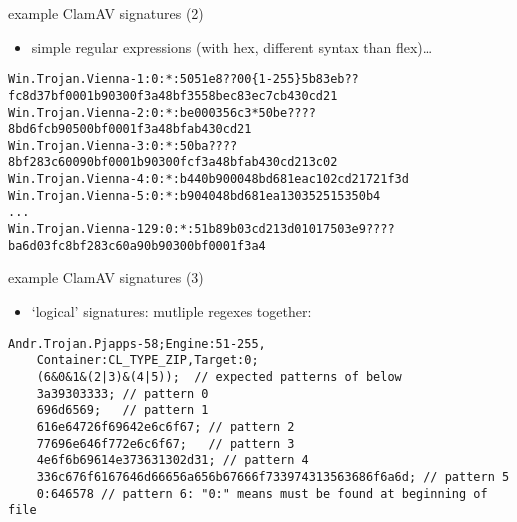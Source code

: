 \begin{frame}[fragile,label=exampleSigsRE]{example ClamAV signatures (2)}
    \begin{itemize}
    \item simple regular expressions (with hex, different syntax than flex)\ldots
    \end{itemize}
\begin{Verbatim}[fontsize=\fontsize{9}{10}]
Win.Trojan.Vienna-1:0:*:5051e8??00{1-255}5b83eb??fc8d37bf0001b90300f3a48bf3558bec83ec7cb430cd21
Win.Trojan.Vienna-2:0:*:be000356c3*50be????8bd6fcb90500bf0001f3a48bfab430cd21
Win.Trojan.Vienna-3:0:*:50ba????8bf283c60090bf0001b90300fcf3a48bfab430cd213c02                     
Win.Trojan.Vienna-4:0:*:b440b900048bd681eac102cd21721f3d
Win.Trojan.Vienna-5:0:*:b904048bd681ea130352515350b4
...
Win.Trojan.Vienna-129:0:*:51b89b03cd213d01017503e9????ba6d03fc8bf283c60a90b90300bf0001f3a4
\end{Verbatim}
\end{frame}

\begin{frame}[fragile,label=exampleSigsLog]{example ClamAV signatures (3)}
    \begin{itemize}
    \item `logical' signatures: mutliple regexes together:
    \end{itemize}
\begin{Verbatim}[fontsize=\fontsize{9}{10}]
Andr.Trojan.Pjapps-58;Engine:51-255,
    Container:CL_TYPE_ZIP,Target:0; 
    (6&0&1&(2|3)&(4|5));  // expected patterns of below
    3a39303333; // pattern 0
    696d6569;   // pattern 1
    616e64726f69642e6c6f67; // pattern 2
    77696e646f772e6c6f67;   // pattern 3
    4e6f6b69614e373631302d31; // pattern 4
    336c676f6167646d66656a656b67666f733974313563686f6a6d; // pattern 5
    0:646578 // pattern 6: "0:" means must be found at beginning of file
\end{Verbatim}
\end{frame}

